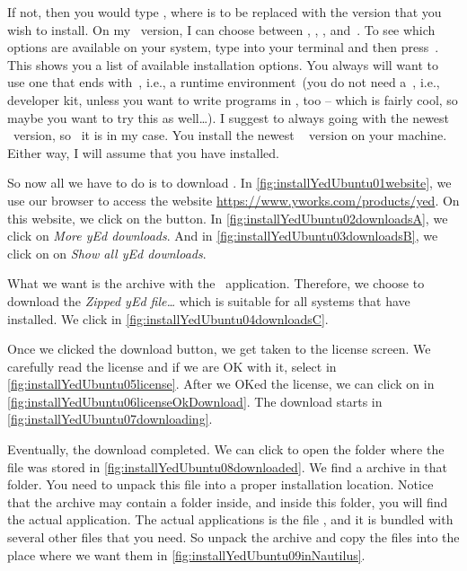 If not, then you would type , where  is to be replaced with the version that you wish to install.
On my \ubuntu\ version, I can choose between , , , and~.
To see which options are available on your system, type  into your terminal and then press~\keys{\tab}.
This shows you a list of available installation options.
You always will want to use one that ends with~, i.e., a runtime environment~(you do not need a~, i.e., developer kit, unless you want to write programs in , too -- which is fairly cool, so maybe you want to try this as well\dots).
I suggest to always going with the newest ~version, so~ it is in my case.
You install the newest ~ version on your machine.
Either way, I will assume that you have  installed.

So now all we have to do is to download \yEd.
In \cref{fig:installYedUbuntu01website}, we use our browser to access the website \url{https://www.yworks.com/products/yed}.
On this website, we click on the  button.
In \cref{fig:installYedUbuntu02downloadsA}, we click on \emph{More yEd downloads}.
And in \cref{fig:installYedUbuntu03downloadsB}, we click on on \emph{Show all yEd downloads}.

What we want is the  archive with the \yEd\ application.
Therefore, we choose to download the \emph{Zipped yEd  file\dots} which is suitable for all systems that have  installed.
We click  in \cref{fig:installYedUbuntu04downloadsC}.

Once we clicked the download button, we get taken to the license screen.
We carefully read the license and if we are OK with it, select  in \cref{fig:installYedUbuntu05license}.
After we OKed the license, we can click on  in \cref{fig:installYedUbuntu06licenseOkDownload}.
The download starts in \cref{fig:installYedUbuntu07downloading}.

Eventually, the download completed.
We can click to open the folder where the file was stored in \cref{fig:installYedUbuntu08downloaded}.
We find a  archive in that folder.
You need to unpack this file into a proper installation location.
Notice that the  archive may contain a folder inside, and inside this folder, you will find the actual application.
The actual applications is the file , and it is bundled with several other files that you need.
So unpack the  archive and copy the files into the place where we want them in \cref{fig:installYedUbuntu09inNautilus}.

